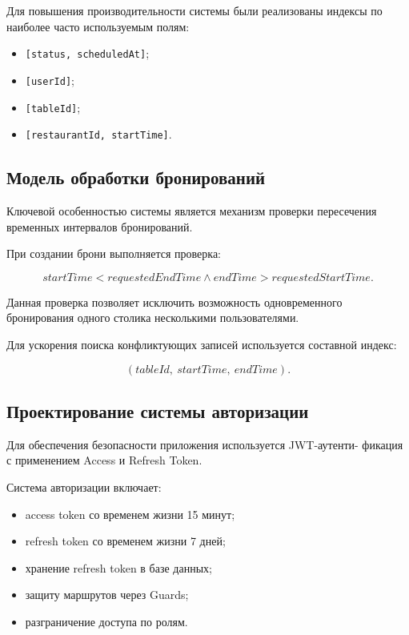 Для повышения производительности системы были реализованы
индексы по наиболее часто используемым полям:

\begin{itemize}
	\item \texttt{[status, scheduledAt]};
	\item \texttt{[userId]};
	\item \texttt{[tableId]};
	\item \texttt{[restaurantId, startTime]}.
\end{itemize}

\subsection{Модель обработки бронирований}

Ключевой особенностью системы является механизм проверки
пересечения временных интервалов бронирований.

При создании брони выполняется проверка:

\begin{equation}
	startTime < requestedEndTime
	\land
	endTime > requestedStartTime.
\end{equation}

Данная проверка позволяет исключить возможность
одновременного бронирования одного столика несколькими пользователями.

Для ускорения поиска конфликтующих записей используется
составной индекс:

\begin{equation}
	(tableId,\ startTime,\ endTime).
\end{equation}

\subsection{Проектирование системы авторизации}

Для обеспечения безопасности приложения используется
JWT-аутенти- фикация с применением Access и Refresh Token.

Система авторизации включает:

\begin{itemize}
	\item access token со временем жизни 15 минут;
	\item refresh token со временем жизни 7 дней;
	\item хранение refresh token в базе данных;
	\item защиту маршрутов через Guards;
	\item разграничение доступа по ролям.
\end{itemize}

